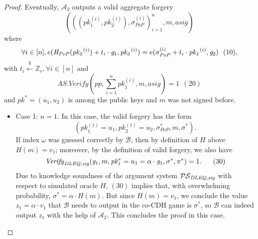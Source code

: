\begin{proof}
\noindent Eventually, $\mathcal{A}_2$ outputs a valid aggregate forgery 
$$(((\mathit{pk}_1^{(i)}, \mathit{pk}_2^{(i)}), \sigma^{(i)}_{\mathit{PoP}})_{i=1}^n, m, \mathit{asig})$$ where 
$$\forall i \in[n], e(\mathit{H}_{\mathit{PoP}}(\mathit{pk_2}^{(i)}) + t_i \cdot \mathit{g}_{1}, \mathit{pk_2}^{(i)}) = 
e(\sigma_{\mathit{PoP}}^{(i)} + t_i \cdot \mathit{pk_1}^{(i)}, \mathit{g}_{2}) \ \ (10), $$ 
with $t_i \xleftarrow{\$} \mathbb{Z}_r, \forall i \in [n]$ and $$\mathit{AS.Verify}(\mathit{pp}, 
\sum_{i=1}^n \mathit{pk}_1^{(i)}, m, \mathit{asig}) = 1 \ \ (20)$$ 
and $\mathit{pk}^* = (u_1, u_2)$ is among the public keys and $m$ was not signed before.
\begin{itemize}
\item Case 1: $n =1$. In this case, the valid forgery has the form 
$$(\mathit{pk}_1^{(1)} = u_1, \mathit{pk}_2^{(1)} = u_2, \sigma^*_{\mathit{PoP}} , m, \sigma^*).$$ 
If index $\omega$ was guessed correctly by $\mathcal{B}$, then by definition of $H$ above $H(m) = v_1$; 
moreover, by the definition of valid forgery, we also have  
$$\mathit{Verify}_{\mathit{DLEQ}, \mathit{sig}}(\mathit{g}_{1}, m, \mathit{pk_1^*}= u_1 = \alpha \cdot \mathit{g}_{1}, \sigma^*, \pi^*) =1. \ \ \ \ \ (30)$$ 
Due to knowledge soundness of the argument system $\mathcal{PS}_{\mathit{DLEQ}, \mathit{sig}}$ with respect to simulated oracle $H$, 
$(30)$ implies that, with overwhelming probability,  
$\sigma^* = \alpha \cdot H(m)$. But since $H(m) = v_1$, we conclude the value $z_1 = \alpha \cdot v_1$ 
that $\mathcal{B}$ needs to output in the co-CDH game is $\sigma^*$, so $\mathcal{B}$ can indeed output $z_1$ 
with the help of $\mathcal{A}_2$. This concludes the proof in this case.


\end{itemize}
\end{proof}
